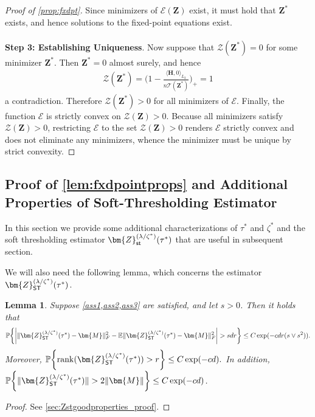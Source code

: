 \documentclass[10pt]{article}
\newcommand{\s}{^*}
\newcommand{\p}{\mathbb{P}}
\newtheorem{lemma}{Lemma}
\theoremstyle{definition}
\begin{document}
\begin{proof}[Proof of \cref{prop:fxdpt}]
Since minimizers of $\mathcal{E}(\bm{Z})$ exist, it must hold that $\bm{Z}\s$ exists, and hence solutions to the fixed-point equations exist.
\\ \ \\
\noindent \textbf{Step 3: Establishing Uniqueness}.   Now suppose that $\mathcal{Z}(\bm{Z}\s) = 0$ for some minimizer $\bm{Z}\s$.  Then $\bm{Z}\s = 0$ almost surely, and hence 
\begin{align}
    \mathcal{Z}(\bm{Z}\s) =  \big( 1- \frac{\langle \bm{H}, 0 \rangle_{L_2}}{n\mathcal{T}(\bm{Z}\s)} \big)_+ = 1
\end{align}
a contradiction.  Therefore $\mathcal{Z}(\bm{Z}\s) > 0$ for all minimizers of $\mathcal{E}$.  Finally, the function $\mathcal{E}$ is strictly convex on $\mathcal{Z}(\bm{Z}) > 0$.  Because all minimizers satisfy $\mathcal{Z}(\bm{Z}) > 0$, restricting $\mathcal{E}$ to the set $\mathcal{Z}(\bm{Z}) > 0$ renders $\mathcal{E}$ strictly convex and does not eliminate any  minimizers, whence the minimizer must be unique by strict convexity.
\end{proof}




\subsection{Proof of \cref{lem:fxdpointprops} and Additional Properties of Soft-Thresholding Estimator} \label{sec:fixedpointprops}
In this section we provide some additional characterizations of $\tau\s$ and $\zeta\s$ and the soft thresholding estimator $\bm{Z}_{{\sf st}}^{(\lambda/\zeta\s)}(\tau\s)$ that are useful in subsequent section.


We will also need the following lemma, which concerns the estimator $\bm{ Z}_{{\sf ST}}^{(\lambda/\zeta\s)}(\tau\s)$. 
\begin{lemma} \label{lem:Zstgoodproperties}
Suppose \cref{ass1,ass2,ass3} are satisfied, and let $s > 0$.  Then it holds that
    \begin{align}
\p\bigg\{      \bigg|  \| \bm{ Z}_{{\sf ST}}^{(\lambda/\zeta\s)}(\tau\s) - \bm{M} \|_F^2 - \mathbb{E} \|\bm{ Z}_{{\sf ST}}^{(\lambda/\zeta\s)}(\tau\s) - \bm{M} \|_F^2 \bigg|  > s d r \bigg\} \leq C \exp(- c dr (s \vee s^2) ).
    \end{align}
    Moreover, $\p\bigg\{ \mathrm{rank}(\bm{ Z}_{{\sf ST}}^{(\lambda/\zeta\s)}(\tau\s)) > r \bigg\} \leq C \exp(- c d).$  In addition, $\p\bigg\{\| \bm{Z}_{{\sf ST}}^{(\lambda/\zeta\s)}(\tau\s) \| > 2 \| \bm{M} \|\bigg\} \leq C\exp(- c d)$.
\end{lemma}
\begin{proof}
    See \cref{sec:Zstgoodproperties_proof}.
\end{proof}
\end{document}

